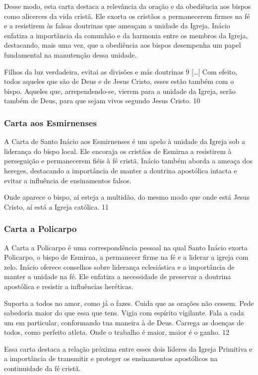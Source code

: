 \documentclass[a4paper,14pt]{extarticle} \usepackage[utf8]{inputenc}
\begin{document}
Desse modo, esta carta destaca a relevância da oração e da obediência aos bispos como alicerces da vida cristã. Ele exorta os cristãos a permanecerem firmes na fé e a resistirem às falsas doutrinas que ameaçam a unidade da Igreja. Inácio enfatiza a importância da comunhão e da harmonia entre os membros da Igreja, destacando, mais uma vez, que a obediência aos bispos desempenha um papel fundamental na manutenção dessa unidade.

Filhos da luz verdadeira, evitai as divisões e más doutrinas 9 […] Com efeito, todos aqueles que são de Deus e de Jesus Cristo, esses estão também com o bispo. Aqueles que, arrependendo-se, vierem para a unidade da Igreja, serão também de Deus, para que sejam vivos segundo Jesus Cristo. 10
\subsubsection{Carta aos Esmirnenses}

A Carta de Santo Inácio aos Esmirnenses é um apelo à unidade da Igreja sob a liderança do bispo local. Ele encoraja os cristãos de Esmirna a resistirem à perseguição e permanecerem fiéis à fé cristã. Inácio também aborda a ameaça dos hereges, destacando a importância de manter a doutrina apostólica intacta e evitar a influência de ensinamentos falsos.

Onde aparece o bispo, aí esteja a multidão, do mesmo modo que onde está Jesus Cristo, aí está a Igreja católica. 11
\subsubsection{Carta a Policarpo}

A Carta a Policarpo é uma correspondência pessoal na qual Santo Inácio exorta Policarpo, o bispo de Esmirna, a permanecer firme na fé e a liderar a igreja com zelo. Inácio oferece conselhos sobre liderança eclesiástica e a importância de manter a unidade na fé. Ele enfatiza a necessidade de preservar a doutrina apostólica e resistir a influências heréticas.

Suporta a todos no amor, como já o fazes. Cuida que as orações não cessem. Pede sabedoria maior do que essa que tens. Vigia com espírito vigilante. Fala a cada um em particular, conformando tua maneira à de Deus. Carrega as doenças de todos, como perfeito atleta. Onde o trabalho é maior, maior é o ganho. 12

Essa carta destaca a relação próxima entre esses dois líderes da Igreja Primitiva e a importância de transmitir e proteger os ensinamentos apostólicos na continuidade da fé cristã.
\end{document}

